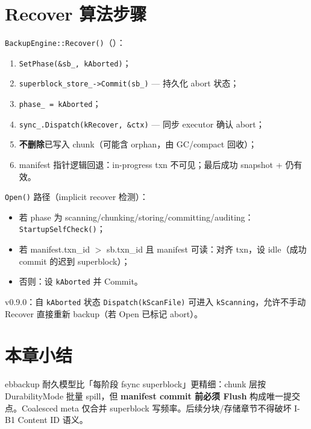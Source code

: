 \section{Recover 算法步骤}

\texttt{BackupEngine::Recover()}（）：

\begin{enumerate}
  \item \texttt{SetPhase(\&sb\_, kAborted)}；
  \item \texttt{superblock\_store\_->Commit(sb\_)} — 持久化 abort 状态；
  \item \texttt{phase\_ = kAborted}；
  \item \texttt{sync\_.Dispatch(kRecover, \&ctx)} — 同步 executor 确认 abort；
  \item \textbf{不删除}已写入 chunk（可能含 orphan，由 GC/compact 回收）；
  \item manifest 指针逻辑回退：in-progress txn 不可见；最后成功 snapshot +  仍有效。
\end{enumerate}

\texttt{Open()} 路径（implicit recover 检测）：
\begin{itemize}[nosep]
  \item 若 phase 为 scanning/chunking/storing/committing/auditing：\texttt{StartupSelfCheck()}；
  \item 若 manifest.txn\_id $>$ sb.txn\_id 且 manifest 可读：对齐 txn，设 idle（成功 commit 的迟到 superblock）；
  \item 否则：设 \texttt{kAborted} 并 Commit。
\end{itemize}

v0.9.0：自 \texttt{kAborted} 状态 \texttt{Dispatch(kScanFile)} 可进入 \texttt{kScanning}，允许不手动 Recover 直接重新 backup（若 Open 已标记 abort）。

\section{本章小结}

ebbackup 耐久模型比「每阶段 fsync superblock」更精细：chunk 层按 DurabilityMode 批量 spill，但 \textbf{manifest commit 前必须 Flush} 构成唯一提交点。Coalesced meta 仅合并 superblock 写频率。后续分块/存储章节不得破坏 I-B1 Content ID 语义。

